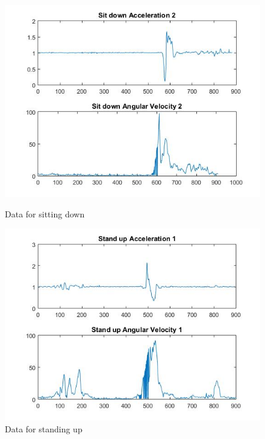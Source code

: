\documentclass[letterpaper,12pt,titlepage,oneside,final]{book}
\begin{document}
\clearpage
\begin{figure}
	\centering
	\hspace{-2cm}
		\begin{minipage}[b]{0.5\textwidth}
		\centering
		\includegraphics[scale=0.42]{sit_2}
		\caption{Data for sitting down}
	\end{minipage}	
	\hfill
	\begin{minipage}[b]{0.5\textwidth}
		\centering
		\includegraphics[scale=0.42]{stand_up_1}
		\caption{Data for standing up}
	\end{minipage}%
\end{figure}
\end{document}
